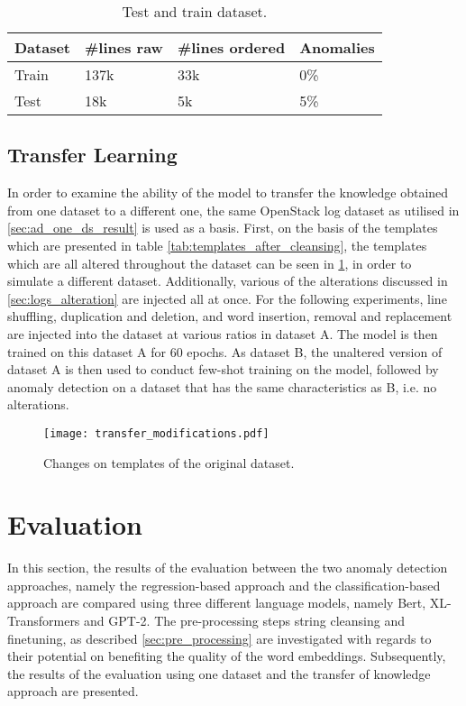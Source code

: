 \begin{table}[ht]
\centering
\begin{small}
\begin{tabular}{ p{1.3cm} p{1.8cm} p{2.3cm} p{1.7cm}}
\toprule
Dataset & \#lines raw & \#lines ordered & Anomalies\\
\midrule
Train & 137k & 33k & 0\%\\
Test & 18k & 5k & 5\%\\ 

\bottomrule
\end{tabular}
\caption{Test and train dataset.}
\label{tab:test_train_ds}
\end{small}
\end{table}



\subsection{Transfer Learning \label{sec:transfer_learning_setup}}
In order to examine the ability of the model to transfer the knowledge obtained from one dataset to a different one, the same OpenStack log dataset as utilised in \ref{sec:ad_one_ds_result} is used as a basis. First, on the basis of the templates which are presented in table \ref{tab:templates_after_cleansing}, the templates which are all altered throughout the dataset can be seen in \ref{fig:transfer_modifications}, in order to simulate a different dataset. Additionally, various of the alterations discussed in \ref{sec:logs_alteration} are injected all at once. For the following experiments, line shuffling, duplication and deletion, and word insertion, removal and replacement are injected into the dataset at various ratios in dataset A. The model is then trained on this dataset A for 60 epochs. As dataset B, the unaltered version of dataset A is then used to conduct few-shot training on the model, followed by anomaly detection on a dataset that has the same characteristics as B, i.e. no alterations.

\begin{figure}[H]
  \centering
  \texttt{[image: transfer\_modifications.pdf]}\\
  \caption{Changes on templates of the original dataset.}
  \label{fig:transfer_modifications}
\end{figure}




\section{Evaluation\label{sec:evaluation}}
In this section, the results of the evaluation between the two anomaly detection approaches, namely the regression-based approach and the classification-based approach are compared using three different language models, namely Bert, XL-Transformers and GPT-2. The pre-processing steps string cleansing and finetuning, as described \ref{sec:pre_processing} are investigated with regards to their potential on benefiting the quality of the word embeddings. Subsequently, the results of the evaluation using one dataset and the transfer of knowledge approach are presented.

